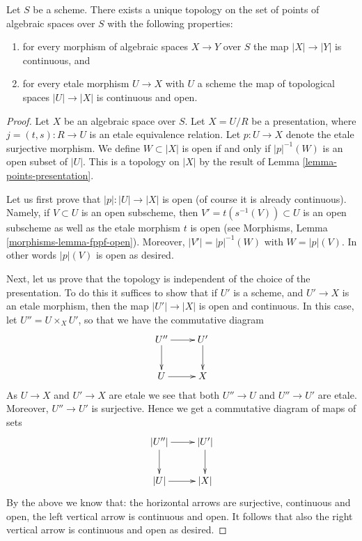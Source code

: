 \begin{lemma}
\label{lemma-topology-points}
Let $S$ be a scheme. There exists a unique topology on the set of points
of algebraic spaces over $S$ with the following properties:
\begin{enumerate}
\item for every morphism of algebraic spaces $X \to Y$ over $S$
the map $|X| \to |Y|$ is continuous, and
\item for every etale morphism $U \to X$ with $U$ a scheme
the map of topological spaces $|U| \to |X|$ is continuous and open.
\end{enumerate}
\end{lemma}

\begin{proof}
Let $X$ be an algebraic space over $S$. Let $X = U/R$ be a presentation,
where $j = (t, s) : R \to U$ is an etale equivalence relation.
Let $p : U \to X$ denote the etale surjective morphism.
We define $W \subset |X|$ is open if and only if $|p|^{-1}(W)$
is an open subset of $|U|$. This is a topology on $|X|$ by
the result of Lemma \ref{lemma-points-presentation}.

\medskip\noindent
Let us first prove that $|p| : |U| \to |X|$ is open (of course it is
already continuous). Namely, if $V \subset U$ is an open subscheme,
then $V' = t(s^{-1}(V)) \subset U$ is an open subscheme as well
as the etale morphism $t$ is open (see
Morphisms, Lemma \ref{morphisms-lemma-fppf-open}).
Moreover, $|V'| = |p|^{-1}(W)$ with $W = |p|(V)$. In other words
$|p|(V)$ is open as desired.

\medskip\noindent
Next, let us prove that the topology is independent of the choice of
the presentation. To do this it suffices to show that if $U'$ is a scheme,
and $U' \to X$ is an etale morphism, then the map $|U'| \to |X|$
is open and continuous. In this case, let $U'' = U \times_X U'$, so that
we have the commutative diagram
$$
\xymatrix{
U'' \ar[r] \ar[d] & U' \ar[d] \\
U \ar[r] & X
}
$$
As $U \to X$ and $U' \to X$ are etale we see that
both $U'' \to U$ and $U'' \to U'$ are etale. Moreover, $U'' \to U'$
is surjective. Hence
we get a commutative diagram of maps of sets
$$
\xymatrix{
|U''| \ar[r] \ar[d] & |U'| \ar[d] \\
|U| \ar[r] & |X|
}
$$
By the above we know that:
the horizontal arrows are surjective, continuous and open,
the left vertical arrow is continuous and open.
It follows that also the right vertical arrow
is continuous and open as desired.


\end{proof}
